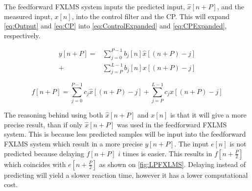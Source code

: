 The feedforward FXLMS system inputs the predicted input, $\hat{x}[n+P]$, and the measured input, $x[n]$, into the control filter and the CP. This will expand \autoref{eq:Output} and \autoref{eq:CP} into \autoref{eq:ControlExpanded} and \autoref{eq:CPExpanded}, respectively.   

\begin{equation}
\label{eq:ControlExpanded}
\begin{split}
y[n+P]=&\sum^{P-1}_{j=0}b_j[n]\hat{x}[(n+P)-j] \\
+&\sum^{L-1}_{j=P}b_j[n]x[(n+P)-j]
\end{split}
\end{equation}



\begin{equation}\label{eq:CPExpanded}
f[n+P]=\sum^{P-1}_{j=0}c_j\hat{x}[(n+P)-j]+\sum^{L-1}_{j=P}c_jx[(n+P)-j]
\end{equation}

The reasoning behind using both $\hat{x}[n+P]$ and $x[n]$ is that it will give a more precise result, than if only $\hat{x}[n+P]$ was used in the feedforward FXLMS system. This is because less predicted samples will be input into the feedforward FXLMS system which result in a more precise $y[n+P]$. The input $e[n]$ is not predicted because delaying $f[n+P]$ $i$ times is easier. This results in $f[n+\frac{P}{2}]$ which coincides with $e[n+\frac{P}{2}]$ as shown on \autoref{fig:LPFXLMS}. Delaying instead of predicting will yield a slower reaction time, however it has a lower computational cost.

